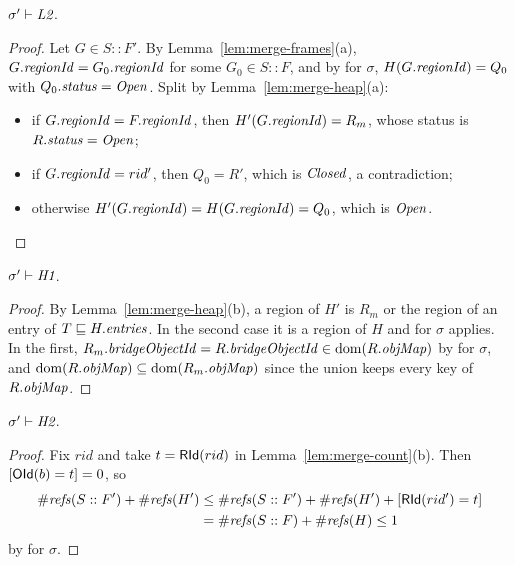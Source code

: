 \begin{lemma}[\inv{L2}] 
$\sigma' \vdash \textit{L2}$.
\end{lemma}
\begin{proof}
Let $G \in S :: F'$. By Lemma~\ref{lem:merge-frames}(a), $G.\mathit{regionId} = G_0.\mathit{regionId}$ for some
$G_0 \in S :: F$, and by  for $\sigma$, $H(G.\mathit{regionId}) = Q_0$ with $Q_0.\mathit{status} = \mathit{Open}$. Split by
Lemma~\ref{lem:merge-heap}(a):
\begin{itemize}[nosep]
  \item if $G.\mathit{regionId} = F.\mathit{regionId}$, then $H'(G.\mathit{regionId}) = R_m$, whose status is $R.\mathit{status} = \mathit{Open}$;
  \item if $G.\mathit{regionId} = rid'$, then $Q_0 = R'$, which is $\mathit{Closed}$, a contradiction;
  \item otherwise $H'(G.\mathit{regionId}) = H(G.\mathit{regionId}) = Q_0$, which is $\mathit{Open}$. \qedhere
\end{itemize}
\end{proof}

\begin{lemma}[\inv{H1}] 
$\sigma' \vdash \textit{H1}$.
\end{lemma}
\begin{proof}
By Lemma~\ref{lem:merge-heap}(b), a region of $H'$ is $R_m$ or the region of an entry of
$T \sqsubseteq H.\mathit{entries}$. In the second case it is a region of $H$ and  for $\sigma$
applies. In the first, $R_m.\mathit{bridgeObjectId} = R.\mathit{bridgeObjectId} \in \mathrm{dom}(R.\mathit{objMap})$ by  for $\sigma$, and
$\mathrm{dom}(R.\mathit{objMap}) \subseteq \mathrm{dom}(R_m.\mathit{objMap})$ since the union keeps every key of $R.\mathit{objMap}$.
\end{proof}

\begin{lemma}[\inv{H2}] 
$\sigma' \vdash \textit{H2}$.
\end{lemma}
\begin{proof}
Fix $rid$ and take $t = \mathsf{RId}(rid)$ in Lemma~\ref{lem:merge-count}(b). Then $[\mathsf{OId}(b) = t] = 0$, so
\begin{align*}
  \#\mathit{refs}(S :: F') + \#\mathit{refs}(H')
  &\le \#\mathit{refs}(S :: F') + \#\mathit{refs}(H') + [\mathsf{RId}(rid') = t] \\
  &= \#\mathit{refs}(S :: F) + \#\mathit{refs}(H) \le 1
\end{align*}
by  for $\sigma$.
\end{proof}

